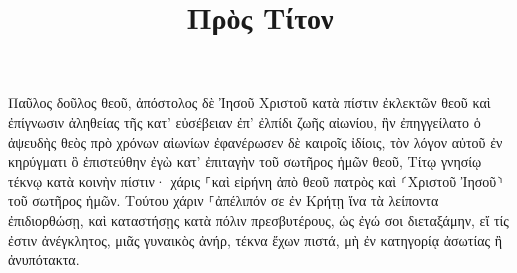 \documentclass{openreader}
\title{Πρὸς Τίτον}
\date{}
\begin{document}
\maketitle
\raggedbottom 
\fontsize{16pt}{24pt}\selectfont


Παῦλος δοῦλος θεοῦ, ἀπόστολος δὲ Ἰησοῦ Χριστοῦ κατὰ πίστιν ἐκλεκτῶν θεοῦ καὶ ἐπίγνωσιν ἀληθείας τῆς κατ’ εὐσέβειαν 
ἐπ’ ἐλπίδι ζωῆς αἰωνίου, ἣν ἐπηγγείλατο ὁ ἀψευδὴς θεὸς πρὸ χρόνων αἰωνίων 
ἐφανέρωσεν δὲ καιροῖς ἰδίοις, τὸν λόγον αὐτοῦ ἐν κηρύγματι ὃ ἐπιστεύθην ἐγὼ κατ’ ἐπιταγὴν τοῦ σωτῆρος ἡμῶν θεοῦ, 
Τίτῳ γνησίῳ τέκνῳ κατὰ κοινὴν πίστιν· χάρις ⸀καὶ εἰρήνη ἀπὸ θεοῦ πατρὸς καὶ ⸂Χριστοῦ Ἰησοῦ⸃ τοῦ σωτῆρος ἡμῶν. 
Τούτου χάριν ⸀ἀπέλιπόν σε ἐν Κρήτῃ ἵνα τὰ λείποντα ἐπιδιορθώσῃ, καὶ καταστήσῃς κατὰ πόλιν πρεσβυτέρους, ὡς ἐγώ σοι διεταξάμην, 
εἴ τίς ἐστιν ἀνέγκλητος, μιᾶς γυναικὸς ἀνήρ, τέκνα ἔχων πιστά, μὴ ἐν κατηγορίᾳ ἀσωτίας ἢ ἀνυπότακτα. 
\end{document}
